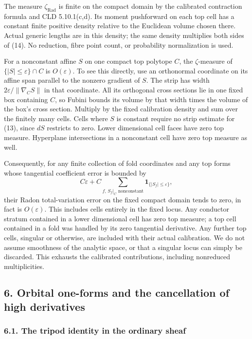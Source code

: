 \documentclass[
  11pt,
]{article}
\begin{document}
The measure \(\zeta_{\mathrm{Rad}}\) is finite on the compact domain by
the calibrated contraction formula and CLD 5.10.1(c,d). Its moment
pushforward on each top cell has a constant finite positive density
relative to the Euclidean volume chosen there. Actual generic lengths
are in this density; the same density multiplies both sides of (14). No
reduction, fibre point count, or probability normalization is used.

For a nonconstant affine \(S\) on one compact top polytope \(C\), the
\(\zeta\)-measure of \(\{|S|\leq\varepsilon\}\cap C\) is
\(O(\varepsilon)\). To see this directly, use an orthonormal coordinate
on its affine span parallel to the nonzero gradient of \(S\). The strip
has width \(2\varepsilon/\|\nabla_C S\|\) in that coordinate. All its
orthogonal cross sections lie in one fixed box containing \(C\), so
Fubini bounds its volume by that width times the volume of the box's
cross section. Multiply by the fixed calibration density and sum over
the finitely many cells. Cells where \(S\) is constant require no strip
estimate for (13), since \(dS\) restricts to zero. Lower dimensional
cell faces have zero top measure. Hyperplane intersections in a
nonconstant cell have zero top measure as well.

Consequently, for any finite collection of fold coordinates and any top
forms whose tangential coefficient error is bounded by \[
 C\varepsilon+C\sum_{f,\,S_f|_C\text{ nonconstant}}
       \mathbf1_{\{|S_f|\leq\varepsilon\}},                 \tag{15}
\] their Radon total-variation error on the fixed compact domain tends
to zero, in fact is \(O(\varepsilon)\). This includes cells entirely in
the fixed locus. Any conductor stratum contained in a lower dimensional
cell has zero top measure; a top cell contained in a fold was handled by
its zero tangential derivative. Any further top cells, singular or
otherwise, are included with their actual calibration. We do not assume
smoothness of the analytic space, or that a singular locus can simply be
discarded. This exhausts the calibrated contributions, including
nonreduced multiplicities.

\subsection{6. Orbital one-forms and the cancellation of high
derivatives}\label{orbital-one-forms-and-the-cancellation-of-high-derivatives}

\subsubsection{6.1. The tripod identity in the ordinary
sheaf}\label{the-tripod-identity-in-the-ordinary-sheaf}
\end{document}
